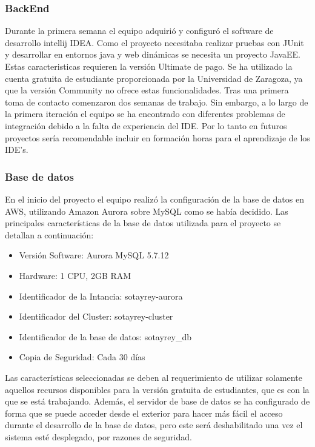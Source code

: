 \subsubsection*{BackEnd}
Durante la primera semana el equipo adquirió y configuró el software de desarrollo intellij IDEA. Como el proyecto necesitaba realizar pruebas con JUnit y desarrollar en entornos java y web dinámicas se necesita un proyecto JavaEE. Estas caracteristicas requieren la versión Ultimate de pago. Se ha utilizado la cuenta gratuita de estudiante proporcionada por la Universidad de Zaragoza, ya que la versión Community no ofrece estas funcionalidades.
Tras una primera toma de contacto comenzaron dos semanas de trabajo. Sin embargo, a lo largo de la primera iteración el equipo se ha encontrado con diferentes problemas de integración debido a la falta de experiencia del IDE. Por lo tanto en futuros proyectos sería recomendable incluir en formación horas para el aprendizaje de los IDE's.

\subsubsection*{Base de datos}
En el inicio del proyecto el equipo realizó la configuración de la base de datos en AWS, utilizando Amazon Aurora sobre MySQL como se había decidido. Las principales características de la base de datos utilizada para el proyecto se detallan a continuación:

\begin{itemize}
	\item Versión Software: Aurora MySQL 5.7.12
	\item Hardware: 1 CPU, 2GB RAM
	\item Identificador de la Intancia: sotayrey-aurora
	\item Identificador del Cluster: sotayrey-cluster
	\item Identificador de la base de datos: sotayrey\_db
	\item Copia de Seguridad: Cada 30 días
\end{itemize}

Las características seleccionadas se deben al requerimiento de utilizar solamente aquellos recursos disponibles para la versión gratuita de estudiantes, que es con la que se está trabajando. Además, el servidor de base de datos se ha configurado de forma que se puede acceder desde el exterior para hacer más fácil el acceso durante el desarrollo de la base de datos, pero este será deshabilitado una vez el sistema esté desplegado, por razones de seguridad.\\

